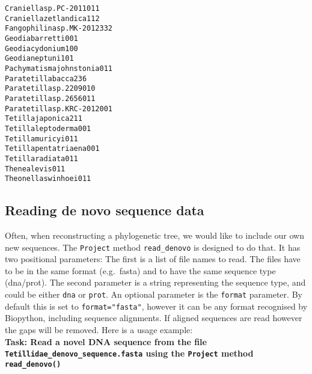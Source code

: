 \documentclass[letterpaper,10pt,english]{/usr/share/sphinx/texinputs/sphinxhowto}
\newenvironment{InvisibleVerbatim}
        {\begin{mdframed}[leftmargin=0.1\linewidth,innerleftmargin=3pt,innerrightmargin=3pt, userdefinedwidth=1\linewidth, linewidth=0pt, linecolor=white, usetwoside=false]}
        {\end{mdframed}}
\begin{document}
\begin{InvisibleVerbatim}
\begin{alltt}
Craniella sp. PC-2011                         0     1     1
Craniella zetlandica                          1     1     2
Fangophilina sp. MK-2012                      3     3     2
Geodia barretti                               0     0     1
Geodia cydonium                               1     0     0
Geodia neptuni                                1     0     1
Pachymatisma johnstonia                       0     1     1
Paratetilla bacca                             2     3     6
Paratetilla sp. 2209                          0     1     0
Paratetilla sp. 2656                          0     1     1
Paratetilla sp. KRC-2012                      0     0     1
Tetilla japonica                              2     1     1
Tetilla leptoderma                            0     0     1
Tetilla muricyi                               0     1     1
Tetilla pentatriaena                          0     0     1
Tetilla radiata                               0     1     1
Thenea levis                                  0     1     1
Theonella swinhoei                            0     1     1
\end{alltt}

            \end{InvisibleVerbatim}
            
        
    
\subsection{Reading de novo sequence
data}\label{reading-de-novo-sequence-data}

Often, when reconstructing a phylogenetic tree, we would like to include
our own new sequences. The \texttt{Project} method \texttt{read\_denovo}
is designed to do that. It has two positional parameters: The first is a
list of file names to read. The files have to be in the same format
(e.g.~fasta) and to have the same sequence type (dna/prot). The second
parameter is a string representing the sequence type, and could be
either \texttt{dna} or \texttt{prot}. An optional parameter is the
\texttt{format} parameter. By default this is set to
\texttt{format="fasta"}, however it can be any format recognised by
Biopython, including sequence alignments. If aligned sequences are read
however the gaps will be removed. Here is a usage example:\\

\textbf{Task: Read a novel DNA sequence from the file
\texttt{Tetillidae\_denovo\_sequence.fasta} using the \texttt{Project}
method \texttt{read\_denovo()}}
\end{document}

